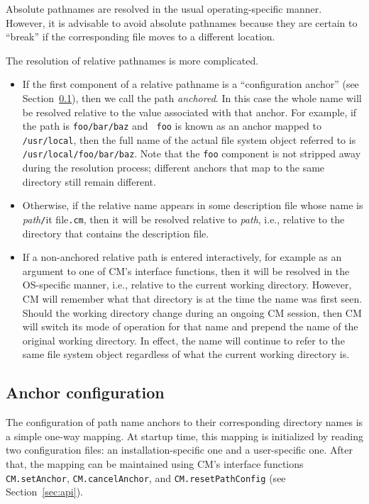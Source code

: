 \documentclass{article}
\begin{document}
Absolute pathnames are resolved in the usual operating-specific
manner.  However, it is advisable to avoid absolute pathnames because
they are certain to ``break'' if the corresponding file moves to a
different location.

The resolution of relative pathnames is more complicated.

\begin{itemize}
\item If the first component of a relative pathname is a
``configuration anchor'' (see Section~\ref{sec:anchors}), then we call
the path {\em anchored}.  In this case  the
whole name will be resolved relative to the value associated with that
anchor.  For example, if the path is {\tt foo/bar/baz} and {\tt
foo} is known as an anchor mapped to {\tt /usr/local}, then the
full name of the actual file system object referred to is {\tt
/usr/local/foo/bar/baz}. Note that the {\tt foo} component is not
stripped away during the resolution process; different anchors that
map to the same directory still remain different.
\item Otherwise, if the relative name appears in some description file
whose name is {\it path}{\tt /}{it file}{\tt .cm}, then it will be
resolved relative to {\it path}, i.e., relative to the directory that
contains the description file.
\item If a non-anchored relative path is entered interactively, for
example as an argument to one of CM's interface functions, then it
will be resolved in the OS-specific manner, i.e., relative to the
current working directory.  However, CM will remember what that
directory is at the time the name was first seen.  Should the working
directory change during an ongoing CM session, then CM will switch its
mode of operation for that name and prepend the name of the original
working directory.  In effect, the name will continue to refer to the
same file system object regardless of what the current working
directory is.
\end{itemize}

\subsection{Anchor configuration}
\label{sec:anchors}

The configuration of path name anchors to their corresponding
directory names is a simple one-way mapping.  At startup time, this
mapping is initialized by reading two configuration files: an
installation-specific one and a user-specific one.  After that, the
mapping can be maintained using CM's interface functions {\tt
CM.setAnchor}, {\tt CM.cancelAnchor}, and {\tt CM.resetPathConfig}
(see Section~\ref{sec:api}).
\end{document}
